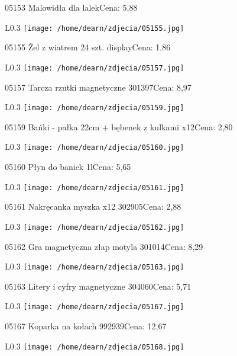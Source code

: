 05153 Malowidła dla lalekCena: 5,88\newline
\begin{wrapfigure}{L}{0.3\textwidth}
\texttt{[image: /home/dearn/zdjecia/05155.jpg]}
\end{wrapfigure}
05155 Żel z wiatrem 24 szt. displayCena: 1,86\newline
\begin{wrapfigure}{L}{0.3\textwidth}
\texttt{[image: /home/dearn/zdjecia/05157.jpg]}
\end{wrapfigure}
05157 Tarcza rzutki magnetyczne 301397Cena: 8,97\newline
\begin{wrapfigure}{L}{0.3\textwidth}
\texttt{[image: /home/dearn/zdjecia/05159.jpg]}
\end{wrapfigure}
05159 Bańki - pałka 22cm + bębenek z kulkami x12Cena: 2,80\newline
\begin{wrapfigure}{L}{0.3\textwidth}
\texttt{[image: /home/dearn/zdjecia/05160.jpg]}
\end{wrapfigure}
05160 Płyn do baniek 1lCena: 5,65\newline
\begin{wrapfigure}{L}{0.3\textwidth}
\texttt{[image: /home/dearn/zdjecia/05161.jpg]}
\end{wrapfigure}
05161 Nakręcanka myszka x12 302905Cena: 2,88\newline
\begin{wrapfigure}{L}{0.3\textwidth}
\texttt{[image: /home/dearn/zdjecia/05162.jpg]}
\end{wrapfigure}
05162 Gra magnetyczna złap motyla 301014Cena: 8,29\newline
\begin{wrapfigure}{L}{0.3\textwidth}
\texttt{[image: /home/dearn/zdjecia/05163.jpg]}
\end{wrapfigure}
05163 Litery i cyfry magnetyczne 304060Cena: 5,71\newline
\begin{wrapfigure}{L}{0.3\textwidth}
\texttt{[image: /home/dearn/zdjecia/05167.jpg]}
\end{wrapfigure}
05167 Koparka na kołach 992939Cena: 12,67\newline
\begin{wrapfigure}{L}{0.3\textwidth}
\texttt{[image: /home/dearn/zdjecia/05168.jpg]}
\end{wrapfigure}
